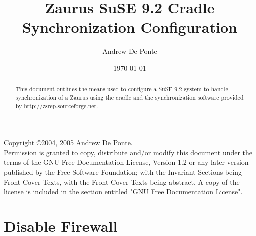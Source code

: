 \documentclass{article}
\title{Zaurus SuSE 9.2 Cradle Synchronization Configuration}
\author{Andrew De Ponte}
\date{\today}
\begin{document}
\maketitle

\newpage

\begin{abstract}
This document outlines the means used to configure a SuSE 9.2 system
to handle synchronization of a Zaurus using the cradle and the synchronization
software provided by http://zsrep.sourceforge.net.
\end{abstract}

\newpage

\noindent Copyright \copyright 2004, 2005 Andrew De Ponte.\\
Permission is granted to copy, distribute and/or modify this document under
the terms of the GNU Free Documentation License, Version 1.2 or any later
version published by the Free Software Foundation; with the Invariant
Sections being Front-Cover Texts, with the Front-Cover  Texts being
abstract. A copy of the license is included in the section entitled "GNU
Free Documentation License".

\newpage

\tableofcontents

\newpage

\section{Disable Firewall}
\end{document}
